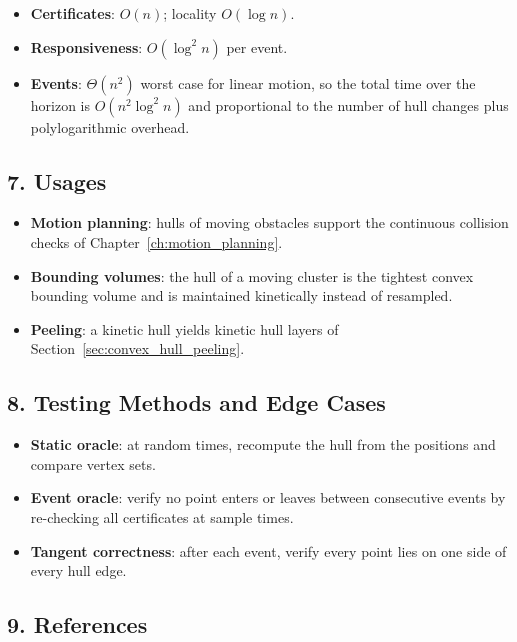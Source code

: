 \begin{itemize}
  \item \textbf{Certificates}: $O(n)$; locality $O(\log n)$.
  \item \textbf{Responsiveness}: $O(\log^2 n)$ per event.
  \item \textbf{Events}: $\Theta(n^2)$ worst case for linear motion, so the
    total time over the horizon is $O(n^2 \log^2 n)$ and proportional to the
    number of hull changes plus polylogarithmic overhead.
\end{itemize}

\subsection{7. Usages}

\begin{itemize}
  \item \textbf{Motion planning}: hulls of moving obstacles support the
    continuous collision checks of Chapter~\ref{ch:motion_planning}.
  \item \textbf{Bounding volumes}: the hull of a moving cluster is the
    tightest convex bounding volume and is maintained kinetically instead of
    resampled.
  \item \textbf{Peeling}: a kinetic hull yields kinetic hull layers of
    Section~\ref{sec:convex_hull_peeling}.
\end{itemize}

\subsection{8. Testing Methods and Edge Cases}

\begin{itemize}
  \item \textbf{Static oracle}: at random times, recompute the hull from the
    positions and compare vertex sets.
  \item \textbf{Event oracle}: verify no point enters or leaves between
    consecutive events by re-checking all certificates at sample times.
  \item \textbf{Tangent correctness}: after each event, verify every point
    lies on one side of every hull edge.
\end{itemize}

\subsection{9. References}

